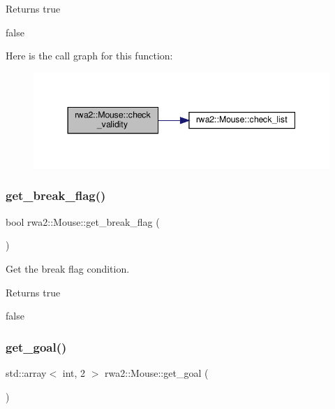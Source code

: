 \begin{DoxyReturn}{Returns}
true 

false 
\end{DoxyReturn}
Here is the call graph for this function\+:\nopagebreak
\begin{figure}[H]
\begin{center}
\leavevmode
\includegraphics[width=344pt]{classrwa2_1_1_mouse_a35873f1fd775399f6506a1da415a8da9_cgraph}
\end{center}
\end{figure}
\mbox{\label{classrwa2_1_1_mouse_a67629e9752358e8a0207e9517e5c904d}} 
\subsubsection{\texorpdfstring{get\+\_\+break\+\_\+flag()}{get\_break\_flag()}}
{\footnotesize\ttfamily bool rwa2\+::\+Mouse\+::get\+\_\+break\+\_\+flag (\begin{DoxyParamCaption}{ }\end{DoxyParamCaption})}



Get the break flag condition. 

\begin{DoxyReturn}{Returns}
true 

false 
\end{DoxyReturn}
\mbox{\label{classrwa2_1_1_mouse_a204d9d2ff255e82885ef3541c77fb0fb}} 
\subsubsection{\texorpdfstring{get\+\_\+goal()}{get\_goal()}}
{\footnotesize\ttfamily std\+::array$<$ int, 2 $>$ rwa2\+::\+Mouse\+::get\+\_\+goal (\begin{DoxyParamCaption}{ }\end{DoxyParamCaption})}




